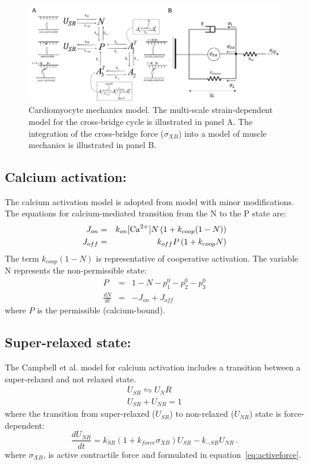 \documentclass[fleqn,10pt]{physiome}
\begin{document}
\begin{figure}[hb]\centering
\includegraphics[width=1.0\linewidth]{FigS1.jpg}
\caption{Cardiomyocyte mechanics model. The multi-scale strain-dependent model for the cross-bridge cycle is illustrated in panel A. The integration of the cross-bridge force ($\sigma_{XB}$) into a model of muscle mechanics is illustrated in panel B.}
\label{fig:crossbridge}
\end{figure}

\subsection{Calcium activation:}
The calcium activation model is adopted from \cite{Campbell2018} model with minor modifications. The equations for calcium-mediated transition from the N to the P state are: 
\begin{eqnarray}
  J_{on}    &=& k_{on}  [{\rm Ca}^{2+} ]  N \left(1 + k_{coop} (1-N) \right) \nonumber \\ 
  J_{off} &=& k_{off}  P \left( 1 + k_{coop}  N \right)
\end{eqnarray}
The term $k_{coop} (1-N)$ is representative of cooperative activation.
The variable N represents the non-permissible state: 
\begin{eqnarray}
  P             &=& 1 - N - p_1^0 - p_2^0 - p_3^0 \nonumber \\
  \frac{dN}{dt} &=& -J_{on} + J_{off} 
\end{eqnarray}
where $P$ is the permissible (calcium-bound).

\subsection{Super-relaxed state:}
The Campbell et al. model for calcium activation includes a transition between a super-relaxed and not relaxed state.
\begin{eqnarray}
 U_{SR} \leftrightharpoons U_NR \nonumber \\
 U_{SR} + U_{NR} = 1
\end{eqnarray}
where the transition from super-relaxed ($U_{SR}$) to non-relaxed ($U_{NR}$) state is force-dependent:
\begin{equation}
  \frac{dU_{NR}}{dt} = k_{SR} \left( 1 + k_{force}  \sigma_{XB} \right)U_{SR} - k_{-SR}  U_{NR} \, .
\end{equation}
where $\sigma_{XB}$, is active contractile force and formulated in equation~\ref{eq:activeforce}. 
\end{document}
